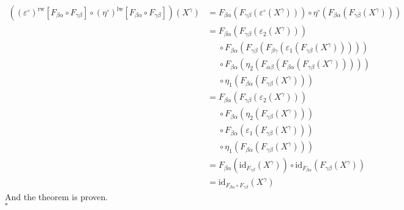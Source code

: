 \begin{prf}
\begin{align*}
  \left(
    (\varepsilon^{\circ})^{\textrm{rw}}[F_{\beta\alpha} \circ F_{\gamma\beta}]
    \circ
    (\eta^{\circ})^{\textrm{lw}}[F_{\beta\alpha} \circ F_{\gamma\beta}]
  \right)
  (X^{\gamma})
  &=
  F_{\beta\alpha}
  \left(
    F_{\gamma\beta}
    \left(
      \varepsilon^{\circ}(X^{\gamma})
    \right)
  \right)
  \circ
  \eta^{\circ}
  \left(
    F_{\beta\alpha}
    \left(
      F_{\gamma\beta}(X^{\gamma})
    \right)
  \right)
  \\
  &=
  F_{\beta\alpha}
  \left(
    F_{\gamma\beta}
    \left(
      \varepsilon_{2}(X^{\gamma})
    \right)
  \right)
  \\
  &\phantom{=}
  \circ
  F_{\beta\alpha}
  \left(
    F_{\gamma\beta}
    \left(
      F_{\beta\gamma}
      \left(
        \varepsilon_{1}
        \left(
          F_{\gamma\beta}(X^{\gamma})
        \right)
      \right)
    \right)
  \right)
  \\
  &\phantom{=}
  \circ
  F_{\beta\alpha}
  \left(
    \eta_{2}
    \left(
      F_{\alpha\beta}
      \left(
        F_{\beta\alpha}
        \left(
          F_{\gamma\beta}(X^{\gamma})
        \right)
      \right)
    \right)
  \right)
  \\
  &\phantom{=}
  \circ
  \eta_{1}
  \left(
    F_{\beta\alpha}
    \left(
      F_{\gamma\beta}(X^{\gamma})
    \right)
  \right)
  \\
  &=
  F_{\beta\alpha}
  \left(
    F_{\gamma\beta}
    \left(
      \varepsilon_{2}(X^{\gamma})
    \right)
  \right)
  \\
  &\phantom{=}
  \circ
  F_{\beta\alpha}
  \left(
    \eta_{2}
    \left(
      F_{\gamma\beta}(X^{\gamma})
    \right)
  \right)
  \\
  &\phantom{=}
  \circ
  F_{\beta\alpha}
  \left(
    \varepsilon_{1}
    \left(
      F_{\gamma\beta}(X^{\gamma})
    \right)
  \right)
  \tag{NT}
  \\
  &\phantom{=}
  \circ
  \eta_{1}
  \left(
    F_{\beta\alpha}
    \left(
      F_{\gamma\beta}(X^{\gamma})
    \right)
  \right)
  \\
  &=
  F_{\beta\alpha}
  \left(
    \mathrm{id}_{F_{\gamma\beta}}(X^{\gamma})
  \right)
  \circ
  \mathrm{id}_{F_{\beta\alpha}}
  \left(
      F_{\gamma\beta}(X^{\gamma})
  \right)
  \\
  &=
  \mathrm{id}_{F_{\beta\alpha} \circ F_{\gamma\beta}}(X^{\gamma})
\end{align*}
And the theorem is proven.
\\
\phantom{proven}
\hfill
$\square$
\end{prf}
